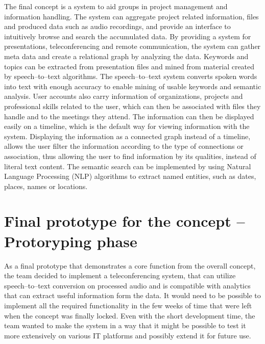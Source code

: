 \documentclass[english,12pt,a4paper,pdftex]{article}
\begin{document}
The final concept is a system to aid groups in project management and information handling. The system can aggregate project related information, files and produced data such as audio recordings, and provide an interface to intuitively browse and search the accumulated data. By providing a system for presentations, teleconferencing and remote communication, the system can gather meta data and create a relational graph by analyzing the data. Keywords and topics can be extracted from presentation files and mined from material created by speech--to--text algorithms. The speech--to--text system converts spoken words into text with enough accuracy to enable mining of usable keywords and semantic analysis. User accounts also carry information of organizations, projects and professional skills related to the user, which can then be associated with files they handle and to the meetings they attend. The information can then be displayed easily on a timeline, which is the default way for viewing information with the system. Displaying the information as a connected graph instead of a timeline, allows the user filter the information according to the type of connections or association, thus allowing the user to find information by its qualities, instead of literal text content. The semantic search can be implemented by using Natural Language Processing (NLP) algorithms to extract named entities, such as dates, places, names or locations.


\clearpage

\section{Final prototype for the concept -- Protoryping phase}


As a final prototype that demonstrates a core function from the overall concept, the team decided to implement a teleconferencing system, that can utilize speech--to--text conversion on processed audio and is compatible with analytics that can extract useful information form the data. It would need to be possible to implement all the required functionality in the few weeks of time that were left when the concept was finally locked. Even with the short development time, the team wanted to make the system in a way that it might be possible to test it more extensively on various IT platforms and possibly extend it for future use.
\end{document}
